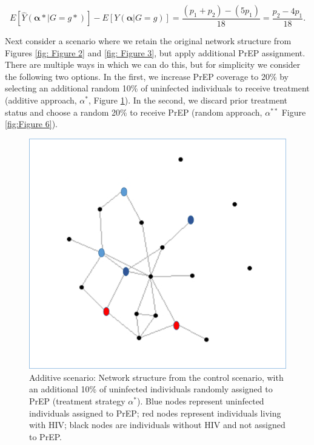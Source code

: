 \documentclass{article}
\theoremstyle{definition}
\begin{document}
\begin{equation}\label{eq:12}
E[\hat{Y}\left(\mathbf{\alpha*}|G=g*\right)] -E[Y\left(\mathbf{\alpha}|G=g\right)] = \frac{\left(p_1 +p_2\right)-\left(5p_1\right)}{18}= \frac{p_2-4p_1}{18}.
\end{equation}


Next consider a scenario where we retain the original network structure from Figures \ref{fig: Figure 2} and \ref{fig: Figure 3}, but apply additional PrEP assignment. There are multiple ways in which we can do this, but for simplicity we consider the following two options. In the first, we increase PrEP coverage to 20\% by selecting an additional random 10\% of uninfected individuals to receive treatment (additive approach, $\alpha^*$, Figure \ref{fig: Figure 5}). In the second, we discard prior treatment status and choose a random 20\% to receive PrEP (random approach, $\alpha^{**}$ Figure \ref{fig:Figure 6}).


\begin{figure}[H]
    \centering
    \includegraphics[scale=0.5]{Original Figures/Network Example 4.png}
    \caption{Additive scenario: Network structure from the control scenario, with an additional 10\%  of uninfected individuals randomly assigned to PrEP (treatment strategy $\alpha^*$). Blue nodes represent uninfected individuals assigned to PrEP; red nodes represent individuals living with HIV; black nodes are individuals without HIV and not assigned to PrEP.}
    \label{fig: Figure 5}
\end{figure}
\end{document}
